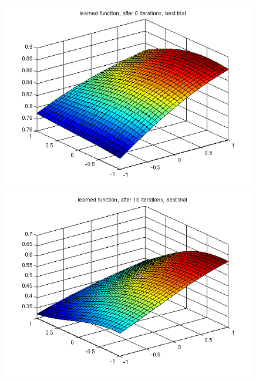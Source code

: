 \begin{figure}[hp!]
\begin{center}
 \begin{minipage}{0.48\textwidth}
 \includegraphics[width=0.99\textwidth]{./figures/1/learned_best_0}
 \end{minipage}
 \begin{minipage}{0.48\textwidth}
 \includegraphics[width=0.99\textwidth]{./figures/1/learned_best_10}
 \end{minipage}
 \begin{minipage}{0.48\textwidth}

\end{minipage}
\end{center}
\end{figure}
